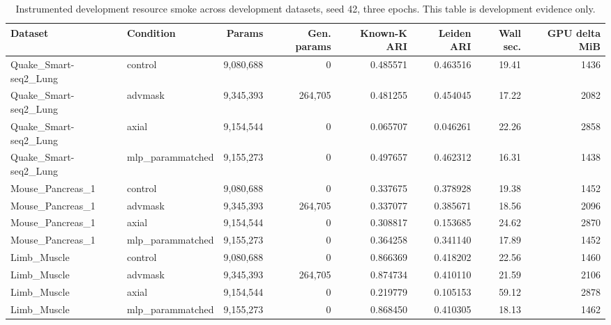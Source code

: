 \begin{table}[ht]
\centering
\caption{Instrumented development resource smoke across development datasets, seed 42, three epochs. This table is development evidence only.}
\label{tab:generated-instrumented-resource-smoke}
\scriptsize
\begin{tabular}{llrrrrrr}
\toprule
Dataset & Condition & Params & Gen. params & Known-K ARI & Leiden ARI & Wall sec. & GPU delta MiB \\
\midrule
Quake\_Smart-seq2\_Lung & control & 9,080,688 & 0 & 0.485571 & 0.463516 & 19.41 & 1436 \\
Quake\_Smart-seq2\_Lung & advmask & 9,345,393 & 264,705 & 0.481255 & 0.454045 & 17.22 & 2082 \\
Quake\_Smart-seq2\_Lung & axial & 9,154,544 & 0 & 0.065707 & 0.046261 & 22.26 & 2858 \\
Quake\_Smart-seq2\_Lung & mlp\_parammatched & 9,155,273 & 0 & 0.497657 & 0.462312 & 16.31 & 1438 \\
Mouse\_Pancreas\_1 & control & 9,080,688 & 0 & 0.337675 & 0.378928 & 19.38 & 1452 \\
Mouse\_Pancreas\_1 & advmask & 9,345,393 & 264,705 & 0.337077 & 0.385671 & 18.56 & 2096 \\
Mouse\_Pancreas\_1 & axial & 9,154,544 & 0 & 0.308817 & 0.153685 & 24.62 & 2870 \\
Mouse\_Pancreas\_1 & mlp\_parammatched & 9,155,273 & 0 & 0.364258 & 0.341140 & 17.89 & 1452 \\
Limb\_Muscle & control & 9,080,688 & 0 & 0.866369 & 0.418202 & 22.56 & 1460 \\
Limb\_Muscle & advmask & 9,345,393 & 264,705 & 0.874734 & 0.410110 & 21.59 & 2106 \\
Limb\_Muscle & axial & 9,154,544 & 0 & 0.219779 & 0.105153 & 59.12 & 2878 \\
Limb\_Muscle & mlp\_parammatched & 9,155,273 & 0 & 0.868450 & 0.410305 & 18.13 & 1462 \\
\bottomrule
\end{tabular}
\end{table}
